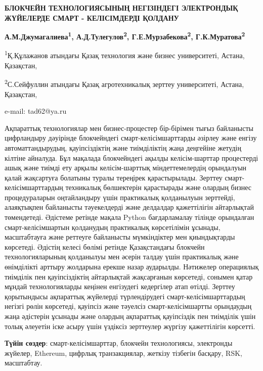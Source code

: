 \begin{center}
{\large\bfseries БЛОКЧЕЙН ТЕХНОЛОГИЯСЫНЫҢ НЕГІЗІНДЕГІ ЭЛЕКТРОНДЫҚ ЖҮЙЕЛЕРДЕ СМАРТ
- КЕЛІСІМДЕРДІ ҚОЛДАНУ}

{\bfseries А.М.Джумагалиева\textsuperscript{1},
А.Д.Тулегулов\textsuperscript{2}, Г.Е.Мурзабекова\textsuperscript{2},
Г.К.Муратова\textsuperscript{2}}

\textsuperscript{1}Қ.Құлажанов атындағы Қазақ технология және бизнес
университеті, Астана, Қазақстан,

\textsuperscript{2}С.Сейфуллин атындағы Қазақ агротехникалық зерттеу
университеті, Астана, Қазақстан,

e-mail: tad62@ya.ru
\end{center}

Ақпараттық технологиялар мен бизнес-процестер бір-бірімен тығыз
байланысты цифрландыру дәуірінде блокчейндегі смарт-келісімшарттарды
әзірлеу және енгізу автоматтандырудың, қауіпсіздіктің және тиімділіктің
жаңа деңгейіне жетудің кілтіне айналуда. Бұл мақалада блокчейндегі
ақылды келісім-шарттар процестерді ашық және тиімді ету арқылы
келісім-шарттық міндеттемелердің орындалуын қалай жақсартуға болатыны
туралы тереңірек қарастырылады. Зерттеу смарт-келісімшарттардың
техникалық бөлшектерін қарастырады және олардың бизнес процедураларын
оңтайландыру үшін практикалық қолданылуын зерттейді, алаяқтықпен
байланысты тәуекелдерді және делдалдар қажеттілігін айтарлықтай
төмендетеді. Әдістеме ретінде мақала Python бағдарламалау тілінде
орындалған смарт-келісімшартын қолданудың практикалық көрсетілімін
ұсынады, масштабтауға және реттеуге байланысты мүмкіндіктер мен
қиындықтарды көрсетеді. Әдістің келесі бөлімі ретінде Қазақстандағы
блокчейн технологияларының қолданылуы мен әсерін талдау үшін практикалық
және өнімділікті арттыру жолдарына ерекше назар аударылды. Нәтижелер
операциялық тиімділік пен қауіпсіздіктің айтарлықтай жақсарғанын
көрсетеді, сонымен қатар мұндай технологияларды кеңінен енгізудегі
кедергілер атап өтілді. Зерттеу қорытындысы ақпараттық жүйелерді
түрлендірудегі смарт-келісімшарттардың негізгі рөлін көрсетеді, қауіпсіз
және тәуелсіз смарт-келісімшартты орындаудың жаңа әдістерін ұсынады және
олардың ақпараттық қауіпсіздік пен тиімділік үшін толық әлеуетін іске
асыру үшін үздіксіз зерттеулер жүргізу қажеттілігін көрсетті.

{\bfseries Түйін сөздер}: смарт-келісімшарттар, блокчейн технологиясы,
электронды жүйелер, Ethereum, цифрлық транзакциялар, жеткізу тізбегін
басқару, RSK, масштабтау.


